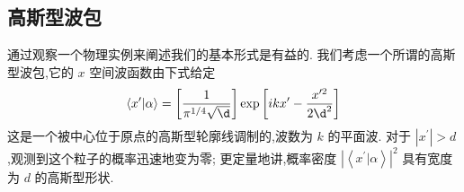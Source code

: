 \subsection{高斯型波包}
通过观察一个物理实例来阐述我们的基本形式是有益的. 我们考虑一个所谓的高斯型波包,它的 $x$ 空间波函数由下式给定
\begin{equation}
	\left\langle {{x}^{\prime } | \alpha }\right\rangle = \left\lbrack \frac{1}{{\pi }^{1/4}\sqrt{\d}}\right\rbrack \exp \left\lbrack {{ik}{x}^{\prime } - \frac{{x}^{\prime 2}}{2{\d}^{2}}}\right\rbrack
\end{equation}
这是一个被中心位于原点的高斯型轮廓线调制的,波数为 $k$ 的平面波. 对于 $\left| {x}^{\prime }\right| > d$ ,观测到这个粒子的概率迅速地变为零; 更定量地讲,概率密度 ${\left| \left\langle {x}^{\prime } | \alpha \right\rangle \right| }^{2}$ 具有宽度为 $d$ 的高斯型形状.

